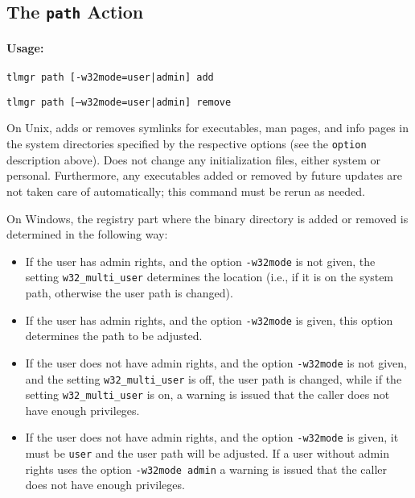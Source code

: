 \documentclass[11pt]{article}
\begin{document}
\clearpage

\subsection{The {\tt path} Action}
\label{path}

\paragraph{Usage:}

\begin{list}{}{}
 \item     \texttt{tlmgr path [-w32mode=user|admin] add}
 \item     \texttt{tlmgr path [--w32mode=user|admin] remove}
\end{list}

On Unix, adds or removes symlinks for executables, man
pages, and info pages in the system directories specified by
the respective options (see the \texttt{option} description
above). Does not change any initialization files, either
system or personal. Furthermore, any executables added
or removed by future updates are not taken care of
automatically; this command must be rerun as needed.

On Windows, the registry part where the binary directory is
added or removed is determined in the following way:
\begin{itemize}

\item If the user has admin rights, and the option
\texttt{-w32mode} is not given, the setting
\texttt{w32\_multi\_user} determines the location (i.e.,
if it is on the system path, otherwise the user path is
changed).

\item If the user has admin rights, and the option
\texttt{-w32mode} is given, this option determines the path
to be adjusted.

\item If the user does not have admin rights, and the
option \texttt{-w32mode} is not given, and the setting
\texttt{w32\_multi\_user} is off, the user path is changed,
while if the setting \texttt{w32\_multi\_user} is on, a
warning is issued that the caller does not have enough
privileges.

\item If the user does not have admin rights, and the option
\texttt{-w32mode} is given, it must be \texttt{user} and
the user path will be adjusted. If a user without admin
rights uses the option \texttt{-w32mode admin} a warning
is issued that the caller does not have enough privileges.
\end{itemize}
\end{document}
